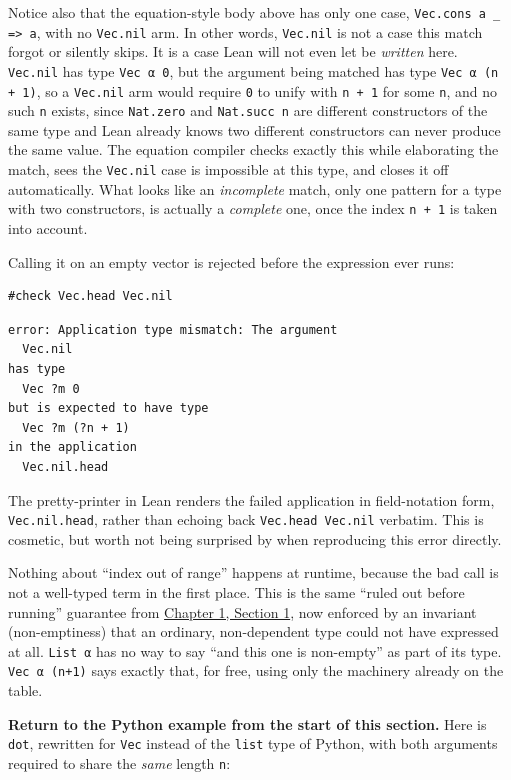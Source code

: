 Notice also that the equation-style body above has only one case, \texttt{Vec.cons a \_\allowbreak{} => a}, with no \texttt{Vec.nil} arm. In other words, \texttt{Vec.nil} is not a case this match forgot or silently skips. It is a case Lean will not even let be \emph{written} here. \texttt{Vec.nil} has type \texttt{Vec α 0}, but the argument being matched has type \texttt{Vec α (n + 1)}, so a \texttt{Vec.nil} arm would require \texttt{0} to unify with \texttt{n + 1} for some \texttt{n}, and no such \texttt{n} exists, since \texttt{Nat.zero} and \texttt{Nat.succ n} are different constructors of the same type and Lean already knows two different constructors can never produce the same value. The equation compiler checks exactly this while elaborating the match, sees the \texttt{Vec.nil} case is impossible at this type, and closes it off automatically. What looks like an \emph{incomplete} match, only one pattern for a type with two constructors, is actually a \emph{complete} one, once the index \texttt{n + 1} is taken into account.

Calling it on an empty vector is rejected before the expression ever runs:

\begin{lstlisting}
#check Vec.head Vec.nil
\end{lstlisting}

\begin{lstlisting}
error: Application type mismatch: The argument
  Vec.nil
has type
  Vec ?m 0
but is expected to have type
  Vec ?m (?n + 1)
in the application
  Vec.nil.head
\end{lstlisting}

The pretty-printer in Lean renders the failed application in field-notation form, \texttt{Vec.nil.head}, rather than echoing back \texttt{Vec.head Vec.nil} verbatim. This is cosmetic, but worth not being surprised by when reproducing this error directly.

Nothing about ``index out of range'' happens at runtime, because the bad call is not a well-typed term in the first place. This is the same ``ruled out before running'' guarantee from \hyperref[sec:01-basics:01-everything-has-a-type:1]{Chapter 1, Section 1}, now enforced by an invariant (non-emptiness) that an ordinary, non-dependent type could not have expressed at all. \texttt{List α} has no way to say ``and this one is non-empty'' as part of its type. \texttt{Vec α (n+1)} says exactly that, for free, using only the machinery already on the table.

\textbf{Return to the Python example from the start of this section.} Here is \texttt{dot}, rewritten for \texttt{Vec} instead of the \texttt{list} type of Python, with both arguments required to share the \emph{same} length \texttt{n}:

